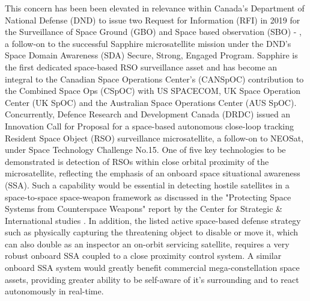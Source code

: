 
This concern has been been elevated in relevance within Canada's Department of National Defense (DND) to issue two Request for Information (RFI) in 2019 for the Surveillance of Space Ground (GBO) and Space based observation (SBO) \cite{dndRfi19a} - \cite{dndRfi19b}, a follow-on to the successful Sapphire microsatellite mission under the DND's Space Domain Awareness (SDA) Secure, Strong, Engaged Program. Sapphire is the first dedicated space-based RSO surveillance asset and has become an integral to the Canadian Space Operations Center's (CANSpOC) contribution to the Combined Space Ops (CSpOC) with US SPACECOM,  UK Space Operation Center (UK SpOC) and the Australian Space Operations Center (AUS SpOC). Concurrently, Defence Research and Development Canada (DRDC) issued an Innovation Call for Proposal  \cite{drdcCall19} for a space-based autonomous close-loop tracking Resident Space Object (RSO) surveillance microsatellite, a follow-on to NEOSat, under Space Technology Challenge No.15. One of five key technologies to be demonstrated is detection of RSOs within close orbital proximity of the microsatellite, reflecting the emphasis of an onboard space situational awareness (SSA). Such a capability would be essential in detecting hostile satellites in a space-to-space space-weapon framework as discussed in the "Protecting Space Systems from Counterspace Weapons" report by the Center for Strategic \& International studies \cite{darkArts21}. In addition, the listed active space-based defense strategy such as physically capturing the threatening object to disable or move it, which can also double as an inspector an on-orbit servicing satellite, requires a very robust onboard SSA coupled to a close proximity control system. A similar onboard SSA system would greatly benefit commercial mega-constellation space assets, providing greater ability to be self-aware of it's surrounding and to react autonomously in real-time.   

